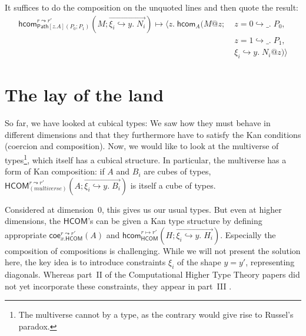 \documentclass{article} \usepackage{chtt-notes} \usepackage{stmaryrd}
\newcommand{\hcom}{\mathsf{hcom}}
\newcommand{\coe}{\mathsf{coe}}
\newcommand{\hcomr}{(M; \overrightarrow{\xi_i \hookrightarrow y. \; N_i})}
\newcommand{\Path}{\mathsf{Path}}
\begin{document}
\begin{center}
\begin{minipage}{.2\textwidth}
\end{minipage}
\end{center}
It suffices to do the composition on the unquoted lines and then quote the result:
\begin{align*}
    \hcom_{\Path[z.A](P_0; P_1)}^{r \leadsto r'}\hcomr \mapsto \langle z. \; \hcom_A (M @ z;\;&z=0 \hookrightarrow \_. \; P_0, \\
    &z=1 \hookrightarrow \_. \; P_1, \\
    &\xi_i \hookrightarrow y. \; N_i @ z) \rangle
\end{align*}

\section{The lay of the land}
So far, we have looked at cubical types: We saw how they must behave in different dimensions and that they furthermore have to satisfy the Kan conditions (coercion and composition).
Now, we would like to look at the multiverse of types\footnote{The multiverse cannot by a type, as the contrary would give rise to Russel's paradox.}, which itself has a cubical structure.
In particular, the multiverse has a form of Kan composition: if $A$ and $B_i$ are cubes of types, $\mathsf{HCOM}_{\mathit{(multiverse)}}^{r \leadsto r'} (A; \overrightarrow{\xi_i \hookrightarrow y.\;B_i})$ is itself a cube of types.

Considered at dimension~0, this gives us our usual types. But even at higher dimensions, the $\mathsf{HCOM}$'s can be given a Kan type structure by defining appropriate $\coe_{x. \mathsf{HCOM}}^{r \leadsto r'}(A)$ and $\hcom_{\mathsf{HCOM}}^{r \mapsto r'}(H; \overrightarrow{\xi_i \hookrightarrow y. \; H_i})$.
Especially the composition of compositions is challenging.
While we will not present the solution here, the key idea is to introduce constraints $\xi_i$ of the shape $y = y'$, representing diagonals.
Whereas part~II of the Computational Higher Type Theory papers \citep{Angiuli:chtt2:16} did not yet incorporate these constraints, they appear in part~III \citep{Angiuli:chtt3:17}.
\end{document}
